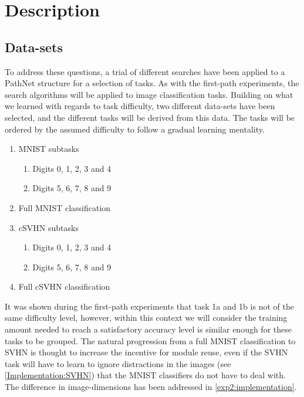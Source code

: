 \section{Description}
\label{exp2:description}
\subsection{Data-sets} 
\label{exp2:datasets}
To address these questions, a trial of different searches have been applied to a PathNet structure for a selection of tasks. As with the first-path experiments, the search algorithms will be applied to image classification tasks. Building on what we learned with regards to task difficulty, two different data-sets have been selected, and the different tasks will be derived from this data. The tasks will be ordered by the assumed difficulty to follow a gradual learning mentality. 

\begin{enumerate}
    \item MNIST subtasks
    \begin{enumerate}
        \item Digits 0, 1, 2, 3 and 4
        \item Digits 5, 6, 7, 8 and 9 
    \end{enumerate}
    \item Full MNIST classification
    \item cSVHN subtasks
    \begin{enumerate}
        \item Digits 0, 1, 2, 3 and 4
        \item Digits 5, 6, 7, 8 and 9 
    \end{enumerate}
    \item Full cSVHN classification
\end{enumerate}

It was shown during the first-path experiments that task 1a and 1b is not of the same difficulty level, however, within this context we will consider the training amount needed to reach a satisfactory accuracy level is similar enough for these tasks to be grouped. The natural progression from a full MNIST classification to  SVHN is thought to increase the incentive for module reuse, even if the SVHN task will have to learn to ignore distractions in the images (see \ref{Implementation:SVHN}) that the MNIST classifiers do not have to deal with. The difference in image-dimensions has been addressed in \ref{exp2:implementation}.

